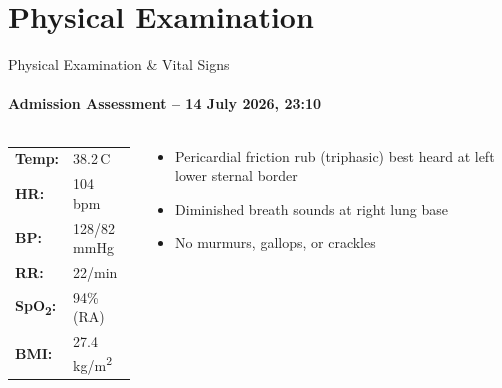 \section{Physical Examination}
\begin{frame}{Physical Examination \& Vital Signs}
  \framesubtitle{Admission Assessment -- 14 July 2026, 23:10}

  \begin{columns}[T]
    \begin{tcolorbox}[infobox,title={\faHeartbeat\hspace{4pt}Vital Signs}]
      \small
      \renewcommand{\arraystretch}{1.25}
      \begin{tabular}{@{}ll@{}}
        \textbf{Temp:}     & 38.2\,\textdegree{}C \\
        \textbf{HR:}       & 104 bpm \\
        \textbf{BP:}       & 128/82 mmHg \\
        \textbf{RR:}       & 22/min \\
        \textbf{SpO\textsubscript{2}:} & 94\% (RA) \\
        \textbf{BMI:}      & 27.4 kg/m\textsuperscript{2} \\
      \end{tabular}
    \end{tcolorbox}

    \vspace{0.2cm}

    \begin{tcolorbox}[highlightbox,title={\faStethoscope\hspace{4pt}Auscultation}]
      \small
      \begin{itemize}
        \item Pericardial friction rub (triphasic) best heard at left lower sternal border
        \item Diminished breath sounds at right lung base
        \item No murmurs, gallops, or crackles
      \end{itemize}
    \end{tcolorbox}


\end{columns}
\end{frame}
